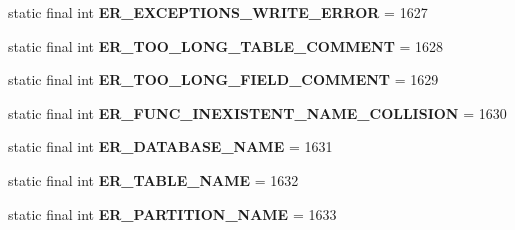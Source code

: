 \begin{DoxyCompactItemize}
static final int {\bfseries E\+R\+\_\+\+E\+X\+C\+E\+P\+T\+I\+O\+N\+S\+\_\+\+W\+R\+I\+T\+E\+\_\+\+E\+R\+R\+OR} = 1627
\item 
\mbox{\label{classcom_1_1mysql_1_1cj_1_1exceptions_1_1_mysql_error_numbers_afbc7b9e8cc2f36d2dda61085ea4da687}} 
static final int {\bfseries E\+R\+\_\+\+T\+O\+O\+\_\+\+L\+O\+N\+G\+\_\+\+T\+A\+B\+L\+E\+\_\+\+C\+O\+M\+M\+E\+NT} = 1628
\item 
\mbox{\label{classcom_1_1mysql_1_1cj_1_1exceptions_1_1_mysql_error_numbers_a9e659cee0a6e064046b1400a30bd5e89}} 
static final int {\bfseries E\+R\+\_\+\+T\+O\+O\+\_\+\+L\+O\+N\+G\+\_\+\+F\+I\+E\+L\+D\+\_\+\+C\+O\+M\+M\+E\+NT} = 1629
\item 
\mbox{\label{classcom_1_1mysql_1_1cj_1_1exceptions_1_1_mysql_error_numbers_ade6b76f135543c6b08b1ac2f28c80b57}} 
static final int {\bfseries E\+R\+\_\+\+F\+U\+N\+C\+\_\+\+I\+N\+E\+X\+I\+S\+T\+E\+N\+T\+\_\+\+N\+A\+M\+E\+\_\+\+C\+O\+L\+L\+I\+S\+I\+ON} = 1630
\item 
\mbox{\label{classcom_1_1mysql_1_1cj_1_1exceptions_1_1_mysql_error_numbers_a500eb031f5390ec1d2fef27577e12a75}} 
static final int {\bfseries E\+R\+\_\+\+D\+A\+T\+A\+B\+A\+S\+E\+\_\+\+N\+A\+ME} = 1631
\item 
\mbox{\label{classcom_1_1mysql_1_1cj_1_1exceptions_1_1_mysql_error_numbers_a00a82193a82d61bf646c8aa963e2bcb7}} 
static final int {\bfseries E\+R\+\_\+\+T\+A\+B\+L\+E\+\_\+\+N\+A\+ME} = 1632
\item 
\mbox{\label{classcom_1_1mysql_1_1cj_1_1exceptions_1_1_mysql_error_numbers_aa78206bdc073eb41569c02ca74315abe}} 
static final int {\bfseries E\+R\+\_\+\+P\+A\+R\+T\+I\+T\+I\+O\+N\+\_\+\+N\+A\+ME} = 1633
\item 
\mbox{\label{classcom_1_1mysql_1_1cj_1_1exceptions_1_1_mysql_error_numbers_aadf676edb7466e00d5d062a3c1c7684d}} 

\end{DoxyCompactItemize}
